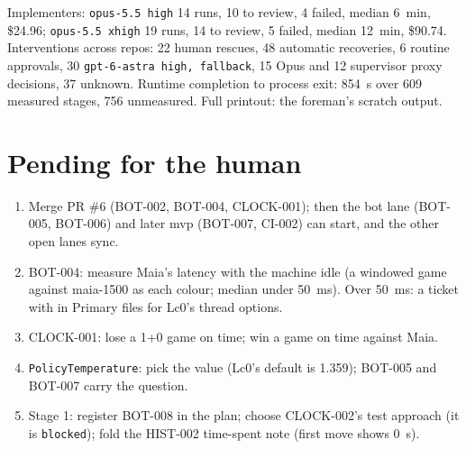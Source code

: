 \documentclass[11pt,a4paper]{article}
\begin{document}
\medskip
Implementers: \texttt{opus-5.5 high} 14 runs, 10 to review, 4 failed, median 6~min, \$24.96;
\texttt{opus-5.5 xhigh} 19 runs, 14 to review, 5 failed, median 12~min, \$90.74. Interventions
across repos: 22 human rescues, 48 automatic recoveries, 6 routine approvals, 30
\texttt{gpt-6-astra high, fallback}, 15 Opus and 12 supervisor proxy decisions, 37 unknown.
Runtime completion to process exit: 854~s over 609 measured stages, 756 unmeasured. Full
printout: the foreman's scratch output.

\section*{Pending for the human}

\begin{enumerate}
  \item Merge PR \#6 (BOT-002, BOT-004, CLOCK-001); then the bot lane (BOT-005, BOT-006) and
        later mvp (BOT-007, CI-002) can start, and the other open lanes sync.
  \item BOT-004: measure Maia's latency with the machine idle (a windowed game against
        maia-1500 as each colour; median under 50~ms). Over 50~ms: a ticket with
         in Primary files for Lc0's thread options.
  \item CLOCK-001: lose a 1+0 game on time; win a game on time against Maia.
  \item \texttt{PolicyTemperature}: pick the value (Lc0's default is 1.359); BOT-005 and
        BOT-007 carry the question.
  \item Stage 1: register BOT-008 in the plan; choose CLOCK-002's test approach (it is
        \texttt{blocked}); fold the HIST-002 time-spent note (first move shows 0~s).
\end{enumerate}
\end{document}
